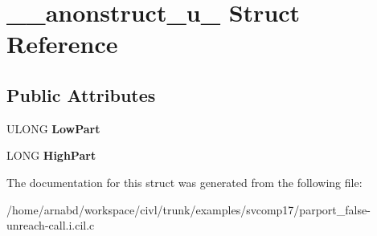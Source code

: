 \hypertarget{struct____anonstruct__u__2}{}\section{\+\_\+\+\_\+anonstruct\+\_\+u\+\_ Struct Reference}
\label{struct____anonstruct__u__2}
\subsection*{Public Attributes}
\begin{DoxyCompactItemize}
\item 
\hypertarget{struct____anonstruct__u__2_a24ae9c34338c04b3d04747b874a11010}{}U\+L\+O\+N\+G {\bfseries Low\+Part}\label{struct____anonstruct__u__2_a24ae9c34338c04b3d04747b874a11010}

\item 
\hypertarget{struct____anonstruct__u__2_a9e5e9194c23d1a78ab49badf7d64d946}{}L\+O\+N\+G {\bfseries High\+Part}\label{struct____anonstruct__u__2_a9e5e9194c23d1a78ab49badf7d64d946}

\end{DoxyCompactItemize}


The documentation for this struct was generated from the following file\+:\begin{DoxyCompactItemize}
\item 
/home/arnabd/workspace/civl/trunk/examples/svcomp17/parport\+\_\+false-\/unreach-\/call.\+i.\+cil.\+c\end{DoxyCompactItemize}
